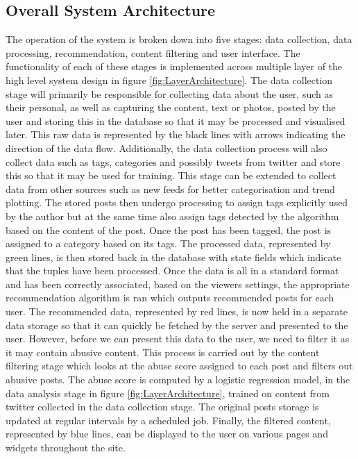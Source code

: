 \subsection{Overall System Architecture}
The operation of the system is broken down into five stages: data collection, data processing, recommendation, content filtering and user interface. The functionality of each of these stages is implemented across multiple layer of the high level system design in figure \ref{fig:LayerArchitecture}. The data collection stage will primarily be responsible for collecting data about the user, such as their personal, as well as capturing the content, text or photos, posted by the user and storing this in the database so that it may be processed and visualised later. This raw data is represented by the black lines with arrows indicating the direction of the data flow. Additionally, the data collection process will also collect data such as tags, categories and possibly tweets from twitter and store this so that it may be used for training. This stage can be extended to collect data from other sources such as new feeds for better categorisation and trend plotting. The stored posts then undergo processing to assign tags explicitly used by the author but at the same time also assign tags detected by the algorithm based on the content of the post. Once the post has been tagged, the post is assigned to a category based on its tags. The processed data, represented by green lines, is then stored back in the database with state fields which indicate that the tuples have been processed. Once the data is all in a standard format and has been correctly associated, based on the viewers settings, the appropriate recommendation algorithm is ran which outputs recommended posts for each user. The recommended data, represented by red lines, is now held in a separate data storage so that it can quickly be fetched by the server and presented to the user. However, before we can present this data to the user, we need to filter it as it may contain abusive content. This process is carried out by the content filtering stage which looks at the abuse score assigned to each post and filters out abusive posts. The abuse score is computed by a logistic regression model, in the data analysis stage in figure \ref{fig:LayerArchitecture}, trained on content from twitter collected in the data collection stage. The original posts storage is updated at regular intervals by a scheduled job. Finally, the filtered content, represented by blue lines, can be displayed to the user on various pages and widgets throughout the site. 

